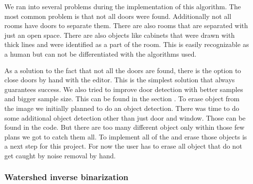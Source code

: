 We ran into several problems during the implementation of this algorithm. The most common problem is that not all doors were found. Additionally not all rooms have doors to separate them. There are also rooms that are separated with just an open space. There are also objects like cabinets that were drawn with thick lines and were identified as a part of the room. This is easily recognizable as a human but can not be differentiated with the algorithms used.

As a solution to the fact that not all the doors are found, there is the option to close doors by hand with the editor. This is the simplest solution that always guarantees success. We also tried to improve door detection with better samples and bigger sample size. This can be found in the section .
To erase object from the image we initially planned to do an object detection. There was time to do some additional object detection other than just door and window. Those can be found in the code. But there are too many different object only within those few plans we got to catch them all. To implement all of the and erase those objects is a next step for this project. For now the user has to erase all object that do not get caught by noise removal by hand.

\subsubsection{Watershed inverse binarization}
